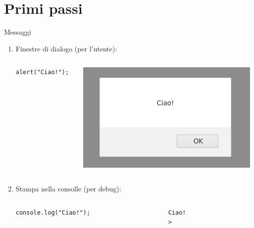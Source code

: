 \section{Primi passi}
\begin{frame}[fragile]{Messaggi}\transfade\centering
  \begin{enumerate}
    \item Finestre di dialogo (per l'utente):
      \begin{columns}
        \begin{column}{.5\textwidth}
          \begin{verbatim}
alert("Ciao!");
          \end{verbatim}
        \end{column}
        \begin{column}{.5\textwidth}\centering
          \includegraphics[width=.6\columnwidth]{img/alert}
        \end{column}
      \end{columns}
    \item Stampa nella consolle (per debug):
    \begin{columns}
      \begin{column}{.5\textwidth}
        \begin{verbatim}
console.log("Ciao!");
          \end{verbatim}
        \end{column}
        \begin{column}{.5\textwidth}
          \begin{verbatim}
Ciao!
>
          \end{verbatim}
        \end{column}
      \end{columns}
  \end{enumerate}
\end{frame}

